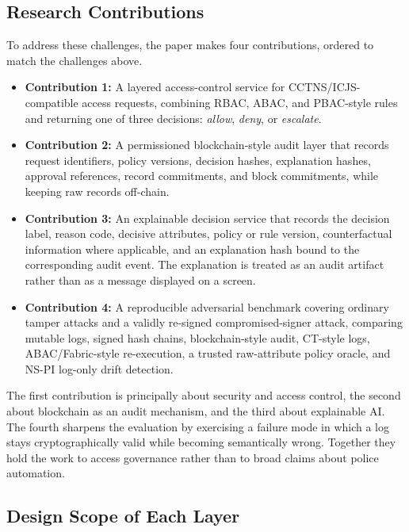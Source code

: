 \subsection{Research Contributions}

To address these challenges, the paper makes four contributions, ordered to
match the challenges above.

\begin{itemize}
    \item \textbf{Contribution 1:} A layered access-control service for
    CCTNS/ICJS-compatible access requests, combining RBAC, ABAC, and PBAC-style
    rules and returning one of three decisions: \emph{allow}, \emph{deny}, or
    \emph{escalate}.

    \item \textbf{Contribution 2:} A permissioned blockchain-style audit layer
    that records request identifiers, policy versions, decision hashes,
    explanation hashes, approval references, record commitments, and block
    commitments, while keeping raw records off-chain.

    \item \textbf{Contribution 3:} An explainable decision service that records
    the decision label, reason code, decisive attributes, policy or rule
    version, counterfactual information where applicable, and an explanation
    hash bound to the corresponding audit event. The explanation is treated as
    an audit artifact rather than as a message displayed on a screen.

    \item \textbf{Contribution 4:} A reproducible adversarial benchmark
    covering ordinary tamper attacks and a validly re-signed compromised-signer
    attack, comparing mutable logs, signed hash chains, blockchain-style audit,
    CT-style logs, ABAC/Fabric-style re-execution, a trusted raw-attribute
    policy oracle, and NS-PI log-only drift detection.
\end{itemize}

The first contribution is principally about security and access control, the
second about blockchain as an audit mechanism, and the third about explainable
AI. The fourth sharpens the evaluation by exercising a failure mode in which a
log stays cryptographically valid while becoming semantically wrong. Together
they hold the work to access governance rather than to broad claims about
police automation.

\subsection{Design Scope of Each Layer}

